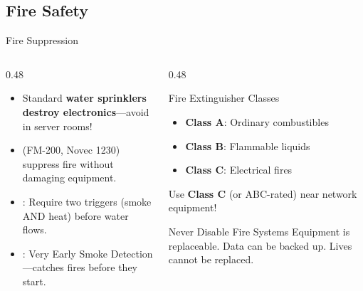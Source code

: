 \documentclass[aspectratio=169]{beamer}  %
\begin{document}
\subsection{Fire Safety}

\begin{frame}{Fire Suppression}
    \begin{columns}[T]
        \begin{column}{0.48\textwidth}
            \begin{itemize}
                \item Standard \textbf{water sprinklers destroy electronics}---avoid in server rooms!
                \item {} (FM-200, Novec 1230) suppress fire without damaging equipment.
                \item {}: Require two triggers (smoke AND heat) before water flows.
                \item {}: Very Early Smoke Detection---catches fires before they start.
            \end{itemize}
        \end{column}
        \begin{column}{0.48\textwidth}
            \begin{block}{Fire Extinguisher Classes}
                \begin{itemize}
                    \item \textbf{Class A}: Ordinary combustibles
                    \item \textbf{Class B}: Flammable liquids
                    \item \textbf{Class C}: Electrical fires
                \end{itemize}
                
                \vspace{0.3em}
                Use \textbf{Class C} (or ABC-rated) near network equipment!
            \end{block}
            
            \vspace{0.3em}
            \begin{alertblock}{Never Disable Fire Systems}
                Equipment is replaceable. Data can be backed up. Lives cannot be replaced.
            \end{alertblock}
        \end{column}
    \end{columns}
\end{frame}
\end{document}
